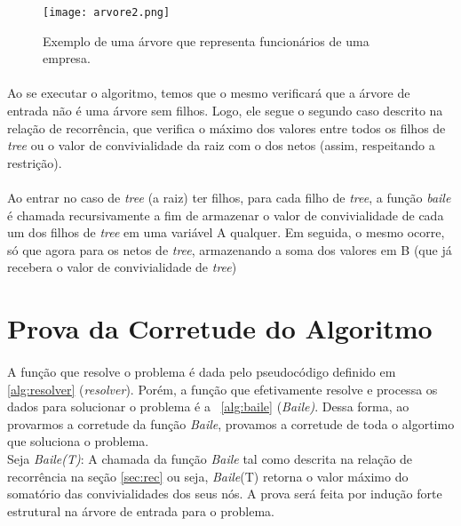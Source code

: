 \documentclass[a4paper]{article}
\begin{document}
\begin{figure}[!htb]
\centering
\texttt{[image: arvore2.png]}
\caption{Exemplo de uma árvore que representa funcionários de uma empresa.}
\label{arvore}
\end{figure}

\paragraph{}Ao se executar o algoritmo, temos que o mesmo verificará que a árvore de entrada não é uma árvore sem filhos. Logo, ele segue o segundo caso descrito na relação de recorrência, que verifica o máximo dos valores entre todos os filhos de \emph{tree} ou o valor de convivialidade da raiz com o dos netos (assim, respeitando a restrição).\\

\paragraph{}Ao entrar no caso de \emph{tree} (a raiz) ter filhos, para cada filho de \emph{tree}, a função \emph{baile} é chamada recursivamente a fim de armazenar o valor de convivialidade de cada um dos filhos de \emph{tree} em uma variável A qualquer. Em seguida, o mesmo ocorre, só que agora para os netos de \emph{tree}, armazenando a soma dos valores em B (que já recebera o valor de convivialidade de \emph{tree}) 

\newpage
\section{Prova da Corretude do Algoritmo}

\paragraph{}A função que resolve o problema é dada pelo pseudocódigo definido em \ref{alg:resolver} (\emph{resolver}). Porém, a função que efetivamente resolve e processa os dados para solucionar o problema é a ~\ref{alg:baile} (\emph{Baile)}. Dessa forma, ao provarmos a corretude da função \emph{Baile}, provamos a corretude de toda o algortimo que soluciona o problema.\\

Seja \emph{Baile(T)}: A chamada da função \emph{Baile} tal como descrita na relação de recorrência na seção \ref{sec:rec} ou seja, \emph{Baile}(T) retorna o valor máximo do somatório das convivialidades dos seus nós. A prova será feita por indução forte estrutural na árvore de entrada para o problema.\\
\end{document}
